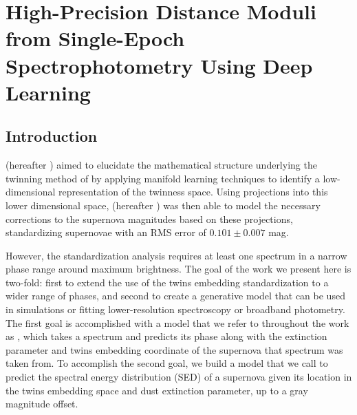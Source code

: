 \chapter{High-Precision Distance Moduli from Single-Epoch Spectrophotometry Using Deep Learning}
\label{chap:nn_twins}

\section{Introduction}
\label{sec:nn_twins_intro}
\citet{boone_twins_2020a} (hereafter ) aimed to elucidate the mathematical structure underlying the twinning method of \citet{fakhouri_improving_2015} by applying manifold learning techniques to identify a low-dimensional representation of the twinness space. Using projections into this lower dimensional space, \citet{boone_twins_2020b} (hereafter ) was then able to model the necessary corrections to the supernova magnitudes based on these projections, standardizing supernovae with an RMS error of $0.101 \pm 0.007$ mag.

However, the  standardization analysis requires at least one spectrum in a narrow phase range around maximum brightness. The goal of the work we present here is two-fold: first to extend the use of the twins embedding standardization to a wider range of phases, and second to create a generative model that can be used in simulations or fitting lower-resolution spectroscopy or broadband photometry. The first goal is accomplished with a model that we refer to throughout the work as \stoe, which takes a spectrum and predicts its phase along with the extinction parameter and twins embedding coordinate of the supernova that spectrum was taken from. To accomplish the second goal, we build a model that we call \etos{} to predict the spectral energy distribution (SED) of a supernova given its location in the twins embedding space and dust extinction parameter, up to a gray magnitude offset.

